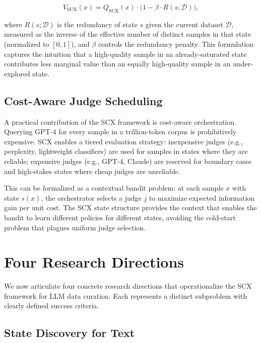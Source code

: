 \documentclass[11pt,twocolumn]{article}
\begin{document}
\begin{equation}
V_{\text{SCX}}(x) = Q_{\text{SCX}}(x) \cdot \bigl(1 - \beta \cdot R(s; \mathcal{D})\bigr),
\label{eq:scx_marginal_value}
\end{equation}

where $R(s; \mathcal{D})$ is the redundancy of state $s$ given the current dataset $\mathcal{D}$, measured as the inverse of the effective number of distinct samples in that state (normalized to $[0,1]$), and $\beta$ controls the redundancy penalty. This formulation captures the intuition that a high-quality sample in an already-saturated state contributes less marginal value than an equally high-quality sample in an under-explored state.

\subsection{Cost-Aware Judge Scheduling}

A practical contribution of the SCX framework is cost-aware orchestration. Querying GPT-4 for every sample in a trillion-token corpus is prohibitively expensive. SCX enables a tiered evaluation strategy: inexpensive judges (e.g., perplexity, lightweight classifiers) are used for samples in states where they are reliable; expensive judges (e.g., GPT-4, Claude) are reserved for boundary cases and high-stakes states where cheap judges are unreliable.

This can be formalized as a contextual bandit problem: at each sample $x$ with state $s(x)$, the orchestrator selects a judge $j$ to maximize expected information gain per unit cost. The SCX state structure provides the context that enables the bandit to learn different policies for different states, avoiding the cold-start problem that plagues uniform judge selection.

\section{Four Research Directions}

We now articulate four concrete research directions that operationalize the SCX framework for LLM data curation. Each represents a distinct subproblem with clearly defined success criteria.

\subsection{State Discovery for Text}
\label{sec:state_discovery}
\end{document}
